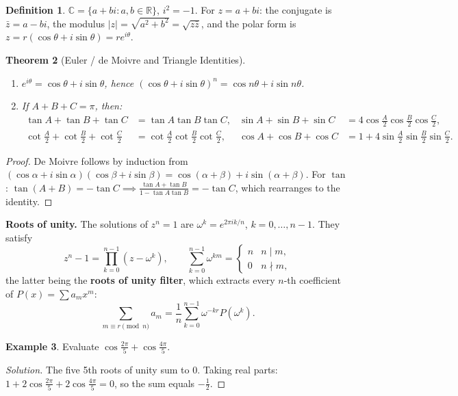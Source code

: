 \documentclass[11pt]{article}
\theoremstyle{plain}
\newtheorem{theorem}{Theorem}[section]
\theoremstyle{definition}
\newtheorem{definition}[theorem]{Definition}
\newtheorem{example}[theorem]{Example}
\newenvironment{solution}{\begin{proof}[Solution]}{\end{proof}}
\newcommand{\RR}{\mathbb{R}}
\newcommand{\CC}{\mathbb{C}}
\begin{document}
\begin{definition}
$\CC = \{a+bi : a,b\in\RR\}$, $i^2=-1$. For $z = a+bi$: the conjugate is
$\bar z = a - bi$, the modulus $|z| = \sqrt{a^2+b^2} = \sqrt{z\bar z}$, and the
polar form is $z = r(\cos\theta + i\sin\theta) = re^{i\theta}$.
\end{definition}

\begin{theorem}[Euler / de Moivre and Triangle Identities]
\leavevmode
\begin{enumerate}[label=(\alph*)]
\item $e^{i\theta} = \cos\theta + i \sin\theta$, hence
$(\cos\theta + i\sin\theta)^n = \cos n\theta + i \sin n\theta$.
\item If $A + B + C = \pi$, then:
\begin{align*}
\tan A + \tan B + \tan C &= \tan A \tan B \tan C, &
\sin A + \sin B + \sin C &= 4\cos\frac{A}{2}\cos\frac{B}{2}\cos\frac{C}{2},\\
\cot\frac{A}{2} + \cot\frac{B}{2} + \cot\frac{C}{2} &= \cot\frac{A}{2}\cot\frac{B}{2}\cot\frac{C}{2}, &
\cos A + \cos B + \cos C &= 1 + 4\sin\frac{A}{2}\sin\frac{B}{2}\sin\frac{C}{2}.
\end{align*}
\end{enumerate}
\end{theorem}
\begin{proof}
De Moivre follows by induction from
$(\cos\alpha + i \sin\alpha)(\cos\beta + i\sin\beta) = \cos(\alpha+\beta) + i\sin(\alpha+\beta)$.
For $\tan$: $\tan(A+B) = -\tan C \implies \frac{\tan A+\tan B}{1-\tan A\tan B} = -\tan C$, which rearranges to the identity.
\end{proof}

\textbf{Roots of unity.} The solutions of $z^n=1$ are
$\omega^k = e^{2\pi i k/n}$, $k=0,\dots,n-1$. They satisfy
\[
z^n - 1 = \prod_{k=0}^{n-1}(z-\omega^k), \qquad
\sum_{k=0}^{n-1} \omega^{km} =
\begin{cases} n & n \mid m,\\ 0 & n \nmid m,\end{cases}
\]
the latter being the \textbf{roots of unity filter}, which extracts every $n$-th coefficient of $P(x) = \sum a_m x^m$:
\[
\sum_{m \equiv r \pmod n} a_m = \frac{1}{n}\sum_{k=0}^{n-1} \omega^{-kr} P(\omega^k).
\]

\begin{example}
Evaluate $\cos\frac{2\pi}{5} + \cos\frac{4\pi}{5}$.
\end{example}
\begin{solution}
The five 5th roots of unity sum to $0$. Taking real parts:
$1 + 2\cos\frac{2\pi}{5} + 2\cos\frac{4\pi}{5} = 0$, so the sum equals $-\tfrac12$.
\end{solution}
\end{document}

